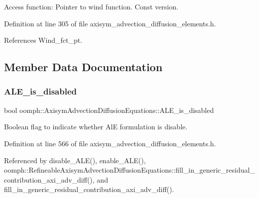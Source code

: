Access function\+: Pointer to wind function. Const version. 



Definition at line 305 of file axisym\+\_\+advection\+\_\+diffusion\+\_\+elements.\+h.



References Wind\+\_\+fct\+\_\+pt.



\subsection{Member Data Documentation}
\mbox{\label{classoomph_1_1AxisymAdvectionDiffusionEquations_abef82e8104dd76a7ff53935efe41765d}} 
\subsubsection{\texorpdfstring{A\+L\+E\+\_\+is\+\_\+disabled}{ALE\_is\_disabled}}
{\footnotesize\ttfamily bool oomph\+::\+Axisym\+Advection\+Diffusion\+Equations\+::\+A\+L\+E\+\_\+is\+\_\+disabled\hspace{0.3cm}{\ttfamily [protected]}}



Boolean flag to indicate whether AlE formulation is disable. 



Definition at line 566 of file axisym\+\_\+advection\+\_\+diffusion\+\_\+elements.\+h.



Referenced by disable\+\_\+\+A\+L\+E(), enable\+\_\+\+A\+L\+E(), oomph\+::\+Refineable\+Axisym\+Advection\+Diffusion\+Equations\+::fill\+\_\+in\+\_\+generic\+\_\+residual\+\_\+contribution\+\_\+axi\+\_\+adv\+\_\+diff(), and fill\+\_\+in\+\_\+generic\+\_\+residual\+\_\+contribution\+\_\+axi\+\_\+adv\+\_\+diff().

\mbox{\label{classoomph_1_1AxisymAdvectionDiffusionEquations_add199570bdd8e75ffe12a37a8bc99ee2}} 
